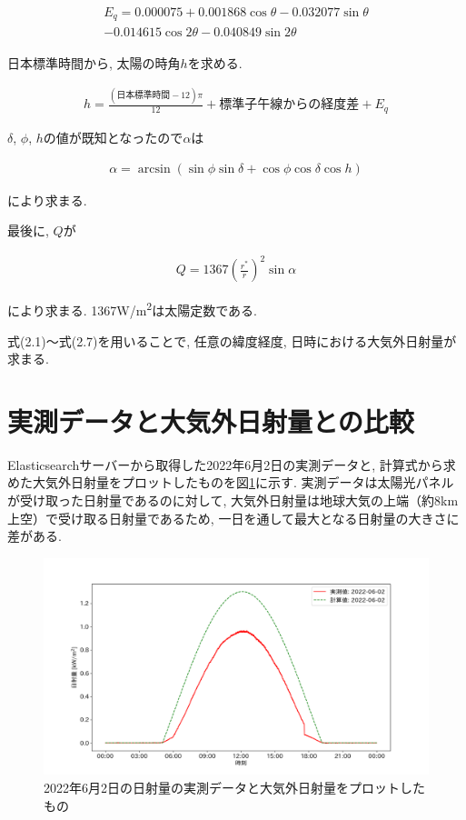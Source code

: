 \begin{eqnarray}
  \begin{split}
    E_q =  0.000075+0.001868\cos \theta-0.032077\sin \theta\\
    -0.014615\cos 2\theta-0.040849\sin 2\theta
  \end{split}
\end{eqnarray}

日本標準時間から, 太陽の時角$h$を求める.

\begin{eqnarray}
  h = \frac{(日本標準時間-12)\pi}{12}+標準子午線からの経度差+E_q
\end{eqnarray}

$\delta$, $\phi$, $h$の値が既知となったので$\alpha$は

\begin{eqnarray}
  \alpha = \arcsin (\sin \phi\sin \delta+\cos \phi\cos \delta\cos h)
\end{eqnarray}

により求まる.

最後に, $Q$が

\begin{eqnarray}
  Q = 1367(\frac{r^{*}}{r})^{2}\sin \alpha
\end{eqnarray}

により求まる. 1367\si{\watt}/\si{\metre\squared}は太陽定数である.

式(2.1)～式(2.7)を用いることで, 任意の緯度経度, 日時における大気外日射量が求まる.


\section{実測データと大気外日射量との比較}
Elasticsearchサーバーから取得した2022年6月2日の実測データと, 計算式から求めた大気外日射量をプロットしたものを図\ref{20220529-p1}に示す. 実測データは太陽光パネルが受け取った日射量であるのに対して, 大気外日射量は地球大気の上端（約8km上空）で受け取る日射量であるため, 一日を通して最大となる日射量の大きさに差がある.

\begin{figure}[h]
  \begin{center}
    \includegraphics[width=160mm]{sotu/figure/2/original-20220602-corr.png}
    \caption{2022年6月2日の日射量の実測データと大気外日射量をプロットしたもの}
    \label{20220529-p1}
  \end{center}
\end{figure}

